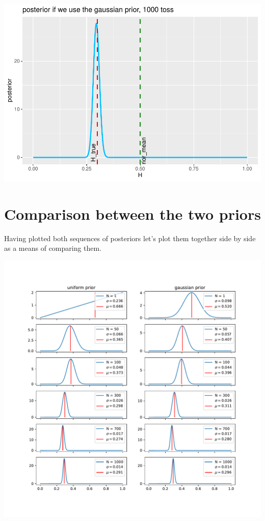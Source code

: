 \documentclass[
]{article}
\begin{document}
\begin{center}\includegraphics[width=0.75\linewidth]{astrostat-1_files/figure-latex/unnamed-chunk-16-1} \end{center}

\hypertarget{comparison-between-the-two-priors}{%
\section{Comparison between the two
priors}\label{comparison-between-the-two-priors}}

Having plotted both sequences of posteriors let's plot them together
side by side as a means of comparing them.

\begin{center}\includegraphics[width=1.0\linewidth]{./astrostat-1-comparison} \end{center}
\end{document}
